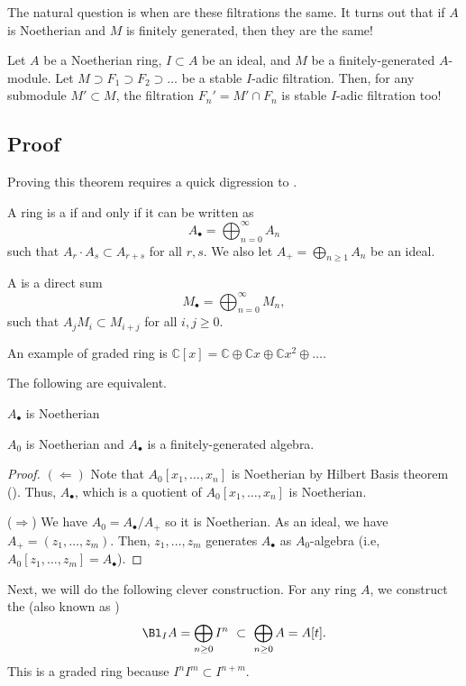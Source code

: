The natural question is when are these filtrations
the same. It turns out that if $A$ is Noetherian
and $M$ is finitely generated, then they are the same!
%
%
%
\begin{theorem}
    \label{thm:artin_rees}
    Let $A$ be a Noetherian ring, $I\subset A$ be an ideal,
    and $M$ be a finitely-generated $A$-module.
    Let $M\supset F_1\supset F_2\supset\dots$
    be a stable $I$-adic filtration.
    Then, for any submodule $M'\subset M$,
    the filtration $F_n' = M'\cap F_n$ is stable
    $I$-adic filtration too!
\end{theorem}
\subsection{Proof}
Proving this theorem requires a quick digression to
.
\begin{definition}
    A ring is a  if and only if
    it can be written as
    $$A_\bullet = \bigoplus_{n=0}^\infty A_n$$
    such that $A_r\cdot A_s\subset A_{r+s}$ for all $r,s$.
    We also let $A_+ = \bigoplus_{n\geq 1} A_n$ be an ideal.

    A  
    is a direct sum
    $$M_\bullet = \bigoplus_{n=0}^\infty M_n,$$
    such that $A_jM_i\subset M_{i+j}$ for all $i,j\geq 0$.
\end{definition}
An example of graded ring is
$\mathbb C[x] = \mathbb C \oplus \mathbb Cx
\oplus \mathbb Cx^2 \oplus\dots$.
\begin{lemma}
    \label{lem:graded_ring_noetherian}
    The following are equivalent.
    \begin{alphenum}
    \item $A_\bullet$ is Noetherian
    \item $A_0$ is Noetherian and $A_\bullet$ is a finitely-generated algebra.
    \end{alphenum}
\end{lemma}
\begin{proof}
    $(\Leftarrow)$ 
    Note that $A_0[x_1,\dots,x_n]$ is Noetherian
    by Hilbert Basis theorem ().
    Thus, $A_\bullet$, which is a quotient of $A_0[x_1,\dots,x_n]$
    is Noetherian.
    
    ($\Rightarrow$) We have $A_0 = A_\bullet / A_+$ so it is Noetherian.
    As an ideal, we have $A_+ = (z_1,\dots,z_m)$.
    Then, $z_1,\dots,z_m$ generates $A_\bullet$ as $A_0$-algebra
    (i.e, $A_0[z_1,\dots,z_m] = A_\bullet$).
\end{proof}
Next, we will do the following clever construction.
For any ring $A$, we construct the 
 (also known as )
$$\Bl_I A = \bigoplus_{n\geq 0} I^n
\  \subset\ \bigoplus_{n\geq 0} A = A[t].$$
This is a graded ring because $I^n I^m\subset I^{n+m}$.

